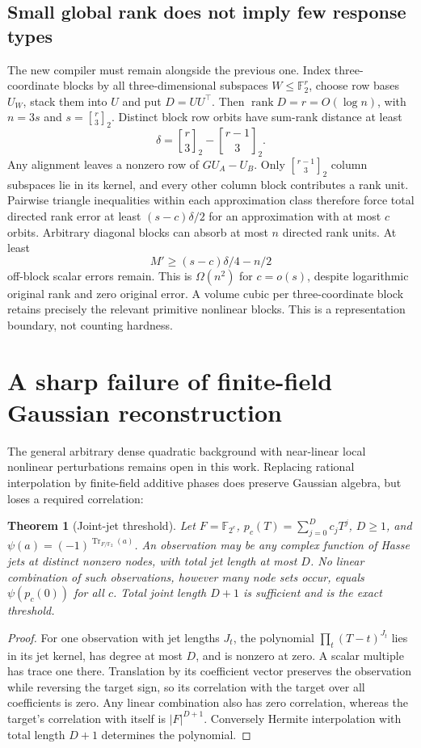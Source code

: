\documentclass[11pt,a4paper]{article}
\newtheorem{theorem}{Theorem}[section]
\newcommand{\F}{\mathbb F}\newcommand{\Z}{\mathbb Z}
\newcommand{\rank}{\operatorname{rank}}\newcommand{\poly}{\operatorname{poly}}
\begin{document}
\subsection{Small global rank does not imply few response types}
The new compiler must remain alongside the previous one.
Index three-coordinate blocks by all three-dimensional subspaces
$W\le\F_2^r$, choose row bases $U_W$, stack them into $U$ and
put $D=UU^\top$. Then $\rank D=r=O(\log n)$, with
$n=3s$ and \(s=\genfrac{[}{]}{0pt}{}{r}{3}_{2}\).
Distinct block row orbits have sum-rank distance at least
\[
\delta=\genfrac{[}{]}{0pt}{}{r}{3}_{2}-\genfrac{[}{]}{0pt}{}{r-1}{3}_{2}.
\]
Any alignment leaves a nonzero row of $GU_A-U_B$.
Only \(\genfrac{[}{]}{0pt}{}{r-1}{3}_{2}\) column subspaces lie in its kernel,
and every other column block contributes a rank unit.
Pairwise triangle inequalities within each approximation class
therefore force total directed rank error at least
$(s-c)\delta/2$ for an approximation with at most $c$ orbits.
Arbitrary diagonal blocks can absorb at most $n$ directed rank
units. At least
\[
M'\ge (s-c)\delta/4-n/2
\]
off-block scalar errors remain. This is $\Omega(n^2)$ for
$c=o(s)$, despite logarithmic original rank and zero original
error. A volume cubic per three-coordinate block retains
precisely the relevant primitive nonlinear blocks.
This is a representation boundary, not counting hardness.

\section{A sharp failure of finite-field Gaussian reconstruction}
\label{sec:failure}
The general arbitrary dense quadratic background with near-linear
local nonlinear perturbations remains open in this work.
Replacing rational interpolation by finite-field additive
phases does preserve Gaussian algebra, but loses a required
correlation:

\begin{theorem}[Joint-jet threshold]
Let $F=\F_{2^e}$, $p_c(T)=\sum_{j=0}^D c_jT^j$, $D\ge1$, and
$\psi(a)=(-1)^{\operatorname{Tr}_{F/\F_2}(a)}$.
An observation may be any complex function of Hasse jets at
distinct nonzero nodes, with total jet length at most $D$.
No linear combination of such observations, however many
node sets occur, equals $\psi(p_c(0))$ for all $c$.
Total joint length $D+1$ is sufficient and is the exact threshold.
\end{theorem}
\begin{proof}
For one observation with jet lengths $J_t$, the polynomial
$\prod_t(T-t)^{J_t}$ lies in its jet kernel, has degree at most
$D$, and is nonzero at zero. A scalar multiple has trace one
there. Translation by its coefficient vector preserves the
observation while reversing the target sign, so its correlation
with the target over all coefficients is zero. Any linear
combination also has zero correlation, whereas the target's
correlation with itself is $|F|^{D+1}$. Conversely Hermite
interpolation with total length $D+1$ determines the polynomial.
\end{proof}
\end{document}
